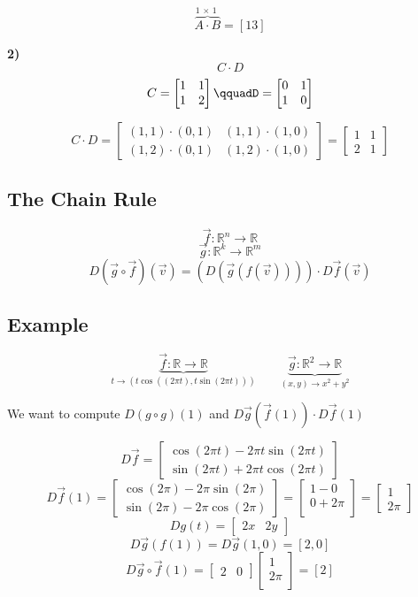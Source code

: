 \documentclass{article}
\begin{document}
\[\overbrace{A\cdot B}^{\mbox{1 $\times$ 1 }}=[13]\]


\textbf{2)}
\[C\cdot D\]
\[C=\begin{bmatrix}
    1&1\\
    1&2
\end{bmatrix}\qquadD=\begin{bmatrix}
    0&1\\
    1&0
\end{bmatrix}\]

\[C\cdot D=\begin{bmatrix}
    (1,1)\cdot (0,1)&(1,1)\cdot (1,0)\\
    (1,2)\cdot (0,1)&(1,2)\cdot (1,0)
\end{bmatrix}=\begin{bmatrix}
    1&1\\
    2&1
\end{bmatrix}\]
\subsection{The Chain Rule}
\[\vec{f}: \mathbb{R}^n\rightarrow\mathbb{R}\]
\[\vec{g}:\mathbb{R}^k\rightarrow\mathbb{R}^m\]
\[D(\vec{g}\circ\vec{f})(\vec{v})=(D(\vec{g}(f(\vec{v}))))\cdot D\vec{f}(\vec{v})\]
\subsection*{Example}
\[\underbrace{\vec{f}:\mathbb{R}\rightarrow\mathbb{R}}_{t\rightarrow(t\cos((2\pi t), t\sin(2\pi t)))}\qquad \underbrace{\vec{g}:\mathbb{R}^2\rightarrow\mathbb{R}}_{(x,y)\rightarrow x^2+y^2}\]

We want to compute $D(g\circ g)(1)$ and $D\vec{g}(\vec{f}(1))\cdot D\vec{f}(1)$

\[D\vec{f}=\begin{bmatrix}
    \cos(2\pi t)-2\pi t\sin(2\pi t)\\
    \sin(2\pi t)+2\pi t\cos(2\pi t)
\end{bmatrix}\]
\[D\vec{f}(1)=\begin{bmatrix}
    \cos(2\pi)-2\pi\sin(2\pi)\\
    \sin(2\pi)-2\pi\cos(2\pi)
\end{bmatrix}=\begin{bmatrix}
    1-0\\
    0+2\pi\\
\end{bmatrix}=\begin{bmatrix}
    1\\
    2\pi
\end{bmatrix}\]
\[Dg(t)=\begin{bmatrix}
    2x&2y
\end{bmatrix}\]
\[D\vec{g}(f(1))=D\vec{g}(1,0)=[2,0]\]
\[D\vec{g}\circ\vec{f}(1)=\begin{bmatrix}
    2&0
\end{bmatrix}\begin{bmatrix}
    1\\
    2\pi\\
\end{bmatrix} = [2]\]
\end{document}
